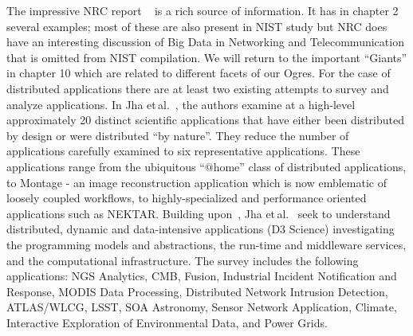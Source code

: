 \documentclass{acm_proc_article-sp}
\begin{document}

The impressive NRC report ~\cite{b13} is a rich source of information. It has in chapter 2 several examples; most of these are also present in NIST study but NRC does have an interesting discussion of Big Data in Networking and Telecommunication that is omitted from NIST compilation. We will return to the important ``Giants'' in chapter 10 which are related to different facets of our Ogres.
For the case of distributed applications there are at least two existing attempts to survey and analyze applications. In Jha et\,al.~\cite{b26}, the authors examine at a high-level approximately 20 distinct scientific applications that have either been distributed by design or were distributed ``by nature''.  They reduce the number of applications carefully examined to six representative applications. These applications range from the ubiquitous ``$@$home'' class of distributed applications, to Montage - an image reconstruction application which is now emblematic of loosely coupled workflows, to highly-specialized and performance oriented applications such as NEKTAR. 
Building upon~\cite{b26}, Jha et\,al.~\cite{b28} seek to understand distributed, dynamic and data-intensive applications (D3 Science) investigating the programming models and abstractions, the run-time and middleware services, and the computational infrastructure. The survey includes the following applications: NGS Analytics, CMB, Fusion, Industrial Incident Notification and Response, MODIS Data Processing, Distributed Network Intrusion Detection, ATLAS/WLCG, LSST, SOA Astronomy, Sensor Network Application, Climate, Interactive Exploration of Environmental Data, and Power Grids. 
\end{document}

